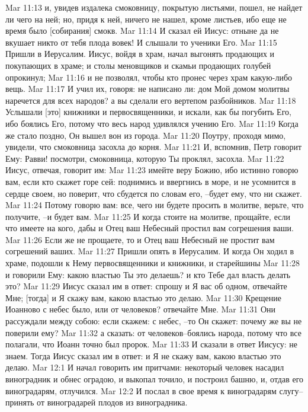 Mar 11:13  и, увидев издалека смоковницу, покрытую листьями, пошел, не найдет ли чего на ней; но, придя к ней, ничего не нашел, кроме листьев, ибо еще не время было [собирания] смокв.
Mar 11:14  И сказал ей Иисус: отныне да не вкушает никто от тебя плода вовек! И слышали то ученики Его.
Mar 11:15  Пришли в Иерусалим. Иисус, войдя в храм, начал выгонять продающих и покупающих в храме; и столы меновщиков и скамьи продающих голубей опрокинул;
Mar 11:16  и не позволял, чтобы кто пронес через храм какую-либо вещь.
Mar 11:17  И учил их, говоря: не написано ли: дом Мой домом молитвы наречется для всех народов? а вы сделали его вертепом разбойников.
Mar 11:18  Услышали [это] книжники и первосвященники, и искали, как бы погубить Его, ибо боялись Его, потому что весь народ удивлялся учению Его.
Mar 11:19  Когда же стало поздно, Он вышел вон из города.
Mar 11:20  Поутру, проходя мимо, увидели, что смоковница засохла до корня.
Mar 11:21  И, вспомнив, Петр говорит Ему: Равви! посмотри, смоковница, которую Ты проклял, засохла.
Mar 11:22  Иисус, отвечая, говорит им:
Mar 11:23  имейте веру Божию, ибо истинно говорю вам, если кто скажет горе сей: поднимись и ввергнись в море, и не усомнится в сердце своем, но поверит, что сбудется по словам его, --будет ему, что ни скажет.
Mar 11:24  Потому говорю вам: все, чего ни будете просить в молитве, верьте, что получите, --и будет вам.
Mar 11:25  И когда стоите на молитве, прощайте, если что имеете на кого, дабы и Отец ваш Небесный простил вам согрешения ваши.
Mar 11:26  Если же не прощаете, то и Отец ваш Небесный не простит вам согрешений ваших.
Mar 11:27  Пришли опять в Иерусалим. И когда Он ходил в храме, подошли к Нему первосвященники и книжники, и старейшины
Mar 11:28  и говорили Ему: какою властью Ты это делаешь? и кто Тебе дал власть делать это?
Mar 11:29  Иисус сказал им в ответ: спрошу и Я вас об одном, отвечайте Мне; [тогда] и Я скажу вам, какою властью это делаю.
Mar 11:30  Крещение Иоанново с небес было, или от человеков? отвечайте Мне.
Mar 11:31  Они рассуждали между собою: если скажем: с небес, --то Он скажет: почему же вы не поверили ему?
Mar 11:32  а сказать: от человеков--боялись народа, потому что все полагали, что Иоанн точно был пророк.
Mar 11:33  И сказали в ответ Иисусу: не знаем. Тогда Иисус сказал им в ответ: и Я не скажу вам, какою властью это делаю.
Mar 12:1  И начал говорить им притчами: некоторый человек насадил виноградник и обнес оградою, и выкопал точило, и построил башню, и, отдав его виноградарям, отлучился.
Mar 12:2  И послал в свое время к виноградарям слугу--принять от виноградарей плодов из виноградника.
